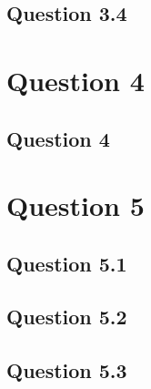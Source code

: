 \documentclass[11pt]{article}
\begin{document}
\subsection{Question 3.4}



\newpage
\section{Question 4}
\subsection{Question 4}


\newpage
\section{Question 5}
\subsection{Question 5.1}

\subsection{Question 5.2}

\subsection{Question 5.3}

\end{document}
